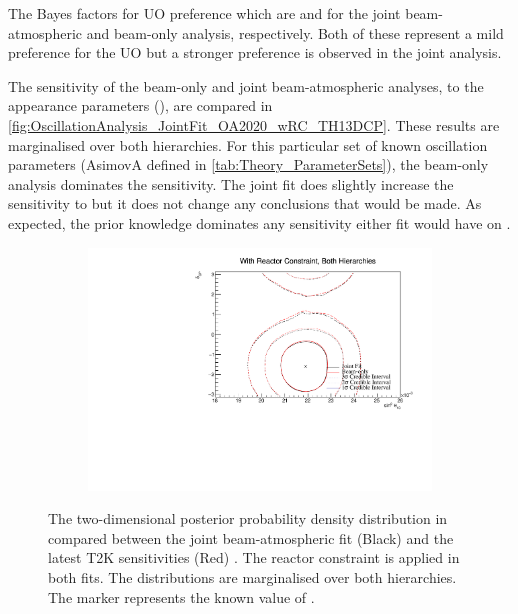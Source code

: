 The Bayes factors for UO preference which are  and  for the joint beam-atmospheric and beam-only analysis, respectively. Both of these represent a mild preference for the UO but a stronger preference is observed in the joint analysis.

The sensitivity of the beam-only and joint beam-atmospheric analyses, to the appearance parameters (), are compared in \autoref{fig:OscillationAnalysis_JointFit_OA2020_wRC_TH13DCP}. These results are marginalised over both hierarchies. For this particular set of known oscillation parameters (AsimovA defined in \autoref{tab:Theory_ParameterSets}), the beam-only analysis dominates the sensitivity. The joint fit does slightly increase the sensitivity to  but it does not change any conclusions that would be made. As expected, the prior knowledge dominates any sensitivity either fit would have on .

\begin{figure}[h]
  \begin{subfigure}[t]{0.98\textwidth}
    \includegraphics[width=\textwidth, trim={0mm 0mm 0mm 0mm}, clip,page=1]{Figures/OA/JointFit_OA2020_wRC_Comp/ContourComparison_2D_th13_dcp_BH_1_wRC_UnSmeared_CredibleInterval.pdf}
  \end{subfigure}
  \caption{The two-dimensional posterior probability density distribution in  compared between the joint beam-atmospheric fit (Black) and the latest T2K sensitivities (Red) \cite{Dunne2020-uf, t2k_tn_393}. The reactor constraint is applied in both fits. The distributions are marginalised over both hierarchies. The marker represents the known value of .}
  \label{fig:OscillationAnalysis_JointFit_OA2020_wRC_TH13DCP}
\end{figure}

